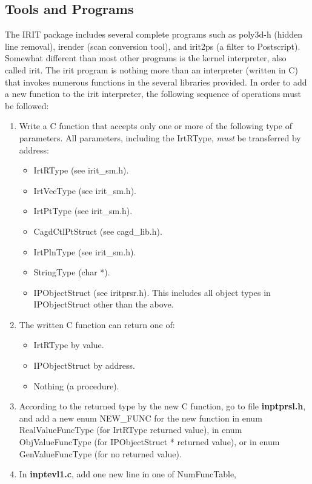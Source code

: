 \subsection{Tools and Programs}

The IRIT package includes several complete programs such as poly3d-h
(hidden line removal), irender (scan conversion tool), and irit2ps (a
filter to Postscript).  Somewhat different than most other programs is
the kernel interpreter, also called irit.  The irit program is nothing
more than an interpreter (written in C) that invokes numerous
functions in the several libraries provided.  In order to add a new
function to the irit interpreter, the following sequence of operations
must be followed:

\begin{enumerate}
\item Write a C function that accepts only one or more of the following
     type of parameters.  All parameters, including the IrtRType, {\em must}
     be transferred by address:
    \begin{itemize}
	\item IrtRType         (see irit\_sm.h).
	\item IrtVecType       (see irit\_sm.h).
	\item IrtPtType        (see irit\_sm.h).
	\item CagdCtlPtStruct  (see cagd\_lib.h).
	\item IrtPlnType       (see irit\_sm.h).
	\item StringType       (char *).
	\item IPObjectStruct   (see iritprsr.h).  This includes all object
		types in IPObjectStruct other than the above.
    \end{itemize}
\item The written C function can return one of:
    \begin{itemize}
	\item IrtRType by value.
	\item IPObjectStruct by address.
	\item Nothing (a procedure).
    \end{itemize}
\item According to the returned type by the new C function, go to file
	{\bf inptprsl.h}, and add a new enum NEW\_FUNC for the new function in
	enum RealValueFuncType (for IrtRType returned value), in
	enum ObjValueFuncType (for IPObjectStruct * returned value), or in
	enum GenValueFuncType (for no returned value).
\item In {\bf inptevl1.c}, add one new line in one of NumFuncTable,

\end{enumerate}
